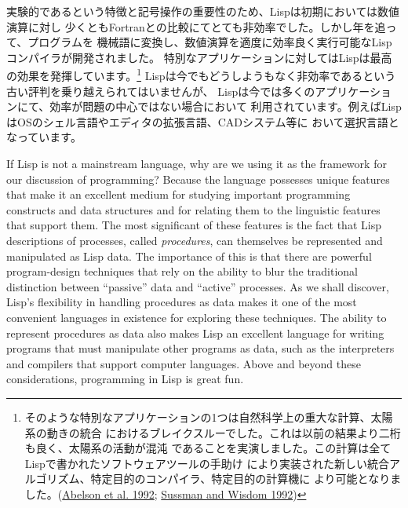 \documentclass[oneside]{book}
\newcommand{\newterm}[1]{\index{#1}\emph{#1}}
\newcommand{\link}[1]{\hyperref[#1]{#1}}
\begin{document}
実験的であるという特徴と記号操作の重要性のため、Lispは初期においては数値演算に対し
少くともFortranとの比較にてとても非効率でした。しかし年を追って、プログラムを
機械語に変換し、数値演算を適度に効率良く実行可能なLispコンパイラが開発されました。
特別なアプリケーションに対してはLispは最高の効果を発揮しています。\footnote{
そのような特別なアプリケーションの1つは自然科学上の重大な計算、太陽系の動きの統合
におけるブレイクスルーでした。これは以前の結果より二桁も良く、太陽系の活動が混沌
であることを実演しました。この計算は全てLispで書かれたソフトウェアツールの手助け
により実装された新しい統合アルゴリズム、特定目的のコンパイラ、特定目的の計算機に
より可能となりました。(\link{Abelson et al. 1992}; \link{Sussman and Wisdom 1992})}
Lispは今でもどうしようもなく非効率であるという古い評判を乗り越えられてはいませんが、
Lispは今では多くのアプリケーションにて、効率が問題の中心ではない場合において
利用されています。例えばLispはOSのシェル言語やエディタの拡張言語、CADシステム等に
おいて選択言語となっています。

If Lisp is not a mainstream language, why are we using it as the framework for
our discussion of programming?  Because the language possesses unique features
that make it an excellent medium for studying important programming constructs
and data structures and for relating them to the linguistic features that
support them.  The most significant of these features is the fact that Lisp
descriptions of processes, called \newterm{procedures}, can themselves be
represented and manipulated as Lisp data.  The importance of this is that there
are powerful program-design techniques that rely on the ability to blur the
traditional distinction between ``passive'' data and ``active'' processes.  As
we shall discover, Lisp's flexibility in handling procedures as data makes it
one of the most convenient languages in existence for exploring these
techniques.  The ability to represent procedures as data also makes Lisp an
excellent language for writing programs that must manipulate other programs as
data, such as the interpreters and compilers that support computer languages.
Above and beyond these considerations, programming in Lisp is great fun.
\end{document}
